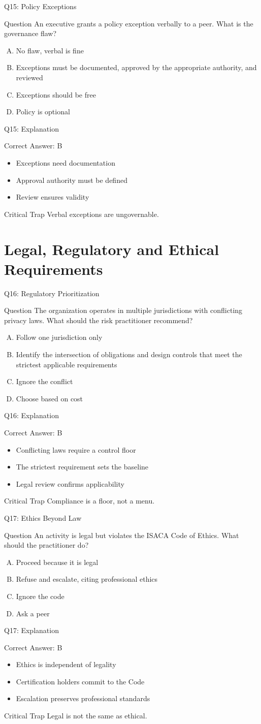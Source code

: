 \documentclass[aspectratio=169]{beamer}
\newcommand{\hq}[7]{%
	\begin{frame}{Q#1: #2}
		\begin{block}{Question}
			#3
		\end{block}
		\begin{enumerate}[(A)]
			#4
		\end{enumerate}
	\end{frame}
	\begin{frame}{Q#1: Explanation}
		\begin{block}{Correct Answer: #5}
			\begin{itemize}
				#6
			\end{itemize}
		\end{block}
		\begin{alertblock}{Critical Trap}
			#7
		\end{alertblock}
	\end{frame}
}
\begin{document}
	\hq{15}{Policy Exceptions}
	{An executive grants a policy exception verbally to a peer. What is the governance flaw?}
	{\item No flaw, verbal is fine
		\item Exceptions must be documented, approved by the appropriate authority, and reviewed
		\item Exceptions should be free
		\item Policy is optional}
	{B}
	{\item Exceptions need documentation
		\item Approval authority must be defined
		\item Review ensures validity}
	{Verbal exceptions are ungovernable.}
	
	\section{Legal, Regulatory and Ethical Requirements}
	
	\hq{16}{Regulatory Prioritization}
	{The organization operates in multiple jurisdictions with conflicting privacy laws. What should the risk practitioner recommend?}
	{\item Follow one jurisdiction only
		\item Identify the intersection of obligations and design controls that meet the strictest applicable requirements
		\item Ignore the conflict
		\item Choose based on cost}
	{B}
	{\item Conflicting laws require a control floor
		\item The strictest requirement sets the baseline
		\item Legal review confirms applicability}
	{Compliance is a floor, not a menu.}
	
	\hq{17}{Ethics Beyond Law}
	{An activity is legal but violates the ISACA Code of Ethics. What should the practitioner do?}
	{\item Proceed because it is legal
		\item Refuse and escalate, citing professional ethics
		\item Ignore the code
		\item Ask a peer}
	{B}
	{\item Ethics is independent of legality
		\item Certification holders commit to the Code
		\item Escalation preserves professional standards}
	{Legal is not the same as ethical.}
	
\end{document}
